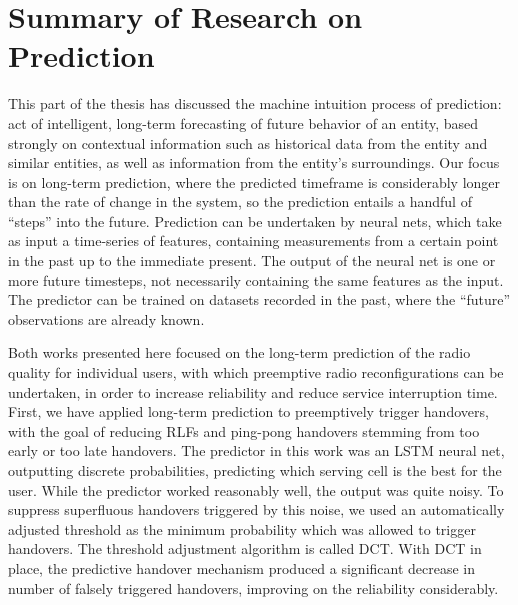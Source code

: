 \chapter{Summary of Research on Prediction}
	\label{cha:sum_prediction}
	
	This part of the thesis has discussed the machine intuition process of prediction: act of intelligent, long-term forecasting of future behavior of an entity, based strongly on contextual information such as historical data from the entity and similar entities, as well as information from the entity's surroundings.
	Our focus is on long-term prediction, where the predicted timeframe is considerably longer than the rate of change in the system, so the prediction entails a handful of ``steps'' into the future.
	Prediction can be undertaken by neural nets, which take as input a time-series of features, containing measurements from a certain point in the past up to the immediate present.
	The output of the neural net is one or more future timesteps, not necessarily containing the same features as the input.
	The predictor can be trained on datasets recorded in the past, where the ``future'' observations are already known.
	
	Both works presented here focused on the long-term prediction of the radio quality for individual users, with which preemptive radio reconfigurations can be undertaken, in order to increase reliability and reduce service interruption time.
	First, we have applied long-term prediction to preemptively trigger handovers, with the goal of reducing \acp{RLF} and ping-pong handovers stemming from too early or too late handovers.
	The predictor in this work was an \ac{LSTM} neural net, outputting discrete probabilities, predicting which serving cell is the best for the user.
	While the predictor worked reasonably well, the output was quite noisy.
	To suppress superfluous handovers triggered by this noise, we used an automatically adjusted threshold as the minimum probability which was allowed to trigger handovers.
	The threshold adjustment algorithm is called \ac{DCT}.
	With \ac{DCT} in place, the predictive handover mechanism produced a significant decrease in number of falsely triggered handovers, improving on the reliability considerably.	
	
